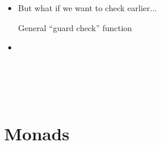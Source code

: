 \documentclass{beamer}
\begin{document}
\begin{itemize}
  \item But what if we want to check earlier...
  
  General ``guard check'' function
  
  {}{}{\hlopt{= }}{}{}{}{\hlopt{[()] }}{}{\hlopt{[]}}{\hlendline{}}
  
  \item {}{}{\hlopt{=}}{\hlendline{}}\\
  {\hlstd{ \ }}{}{\hlopt{(}}{\hlstd{{\hlopt{\textbar}}}}{\hlopt{->)
  }}{}{\hlendline{}}\\
  {}{\hlopt{<-- }}{}{\hlopt{;}}{\hlendline{}}\\
  {}{\hlopt{<-- }}{}{\hlopt{;}}{\hlendline{}}\\
  {}{\hlopt{(}}{}{\hlopt{= }}{}{}{\hlopt{);}}{\hlendline{}}\\
  {\hlstd{ \ \ \ }}{\hlopt{[}}{}{\hlopt{]}}{\hlendline{}}
\end{itemize}

\section{Monads}
\end{document}
